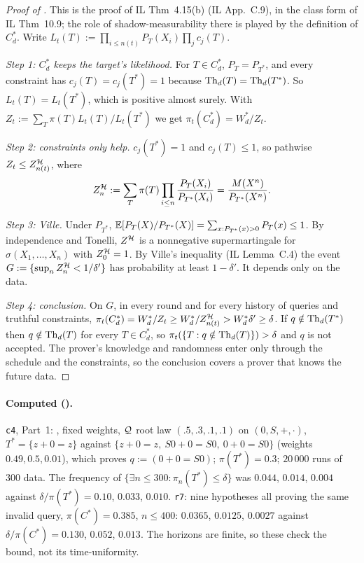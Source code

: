 \begin{proof}[Proof of ]
This is the proof of IL Thm~4.15(b) (IL App.~C.9), in the class form of IL Thm~10.9; the role of shadow-measurability there is played by the definition of $C^*_d$. Write $L_t(T):=\prod_{i\le n(t)}P_T(X_i)\prod_jc_j(T)$.

\emph{Step 1: $C^*_d$ keeps the target's likelihood.} For $T\in C^*_d$, $P_T=P_{T^*}$, and every constraint has $c_j(T)=c_j(T^*)=1$ because $\mathrm{Th}_d(T)=\mathrm{Th}_d(T^*)$. So $L_t(T)=L_t(T^*)$, which is positive almost surely. With $Z_t:=\sum_T\pi(T)L_t(T)/L_t(T^*)$ we get $\pi_t(C^*_d)=W^*_d/Z_t$.

\emph{Step 2: constraints only help.} $c_j(T^*)=1$ and $c_j(T)\le1$, so pathwise $Z_t\le Z^{\mathcal{H}}_{n(t)}$, where
\[
Z^{\mathcal{H}}_n:=\sum_T\pi(T)\prod_{i\le n}\frac{P_T(X_i)}{P_{T^*}(X_i)}=\frac{M(X^n)}{P_{T^*}(X^n)} .
\]

\emph{Step 3: Ville.} Under $P_{T^*}$, $\mathbb{E}[P_T(X)/P_{T^*}(X)]=\sum_{x:P_{T^*}(x)>0}P_T(x)\le1$. By independence and Tonelli, $Z^{\mathcal{H}}$ is a nonnegative supermartingale for $\sigma(X_1,\dots,X_n)$ with $Z^{\mathcal{H}}_0=1$. By Ville's inequality (IL Lemma~C.4) the event $G:=\{\sup_nZ^{\mathcal{H}}_n<1/\delta'\}$ has probability at least $1-\delta'$. It depends only on the data.

\emph{Step 4: conclusion.} On $G$, in every round and for every history of queries and truthful constraints, $\pi_t(C^*_d)=W^*_d/Z_t\ge W^*_d/Z^{\mathcal{H}}_{n(t)}>W^*_d\delta'\ge\delta$. If $q\notin\mathrm{Th}_d(T^*)$ then $q\notin\mathrm{Th}_d(T)$ for every $T\in C^*_d$, so $\pi_t(\{T:q\notin\mathrm{Th}_d(T)\})>\delta$ and $q$ is not accepted. The prover's knowledge and randomness enter only through the schedule and the constraints, so the conclusion covers a prover that knows the future data.
\end{proof}

\paragraph{Computed ().} \texttt{c4}, Part~1: \Lzero{}, fixed weights, $\mathcal{Q}$ root law $(.5,.3,.1,.1)$ on $(0,S,+,\cdot)$, $T^*=\{z+0=z\}$ against $\{z+0=z,\ S0+0=S0,\ 0+0=S0\}$ (weights $0.49,0.5,0.01$), which proves $q:=(0+0=S0)$; $\pi(T^*)=0.3$; $20\,000$ runs of $300$ data. The frequency of $\{\exists n\le300:\pi_n(T^*)\le\delta\}$ was $0.044$, $0.014$, $0.004$ against $\delta/\pi(T^*)=0.10$, $0.033$, $0.010$. \texttt{r7}: nine hypotheses all proving the same invalid query, $\pi(C^*)=0.385$, $n\le400$: $0.0365$, $0.0125$, $0.0027$ against $\delta/\pi(C^*)=0.130$, $0.052$, $0.013$. The horizons are finite, so these check the bound, not its time-uniformity.

